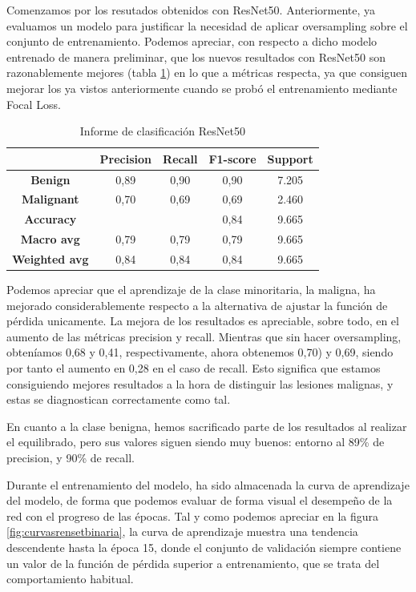 Comenzamos por los resutados obtenidos con ResNet50. Anteriormente, ya evaluamos un modelo para justificar la necesidad de aplicar oversampling sobre el conjunto de entrenamiento. Podemos apreciar, con respecto a dicho modelo entrenado de manera preliminar, que los nuevos resultados con ResNet50 son razonablemente mejores (tabla \ref{tab:resultsbinrn50}) en lo que a métricas respecta, ya que consiguen mejorar los ya vistos anteriormente cuando se probó el entrenamiento mediante Focal Loss.

\begin{table}[!ht]
	\centering
	\begin{tabular}{|c|c|c|c|c|}
		\hline
		\textbf{} & \textbf{Precision} & \textbf{Recall} & \textbf{F1-score} & \textbf{Support} \\ \hline
		\textbf{Benign} & 0,89 & 0,90 & 0,90 & 7.205 \\ \hline
		\textbf{Malignant} & 0,70 & 0,69 & 0,69 & 2.460 \\ \hline
		\textbf{Accuracy} & ~ & ~ & 0,84 & 9.665 \\ \hline
		\textbf{Macro avg} & 0,79 & 0,79 & 0,79 & 9.665 \\ \hline
		\textbf{Weighted avg} & 0,84 & 0,84 & 0,84 & 9.665 \\ \hline
	\end{tabular}
	\caption{Informe de clasificación ResNet50}
	\label{tab:resultsbinrn50}
\end{table}


Podemos apreciar que el aprendizaje de la clase minoritaria, la maligna, ha mejorado considerablemente respecto a la alternativa de ajustar la función de pérdida unicamente. La mejora de los resultados es apreciable, sobre todo, en el aumento de las métricas precision y recall. Mientras que sin hacer oversampling, obteníamos 0,68 y 0,41, respectivamente, ahora obtenemos 0,70) y 0,69, siendo por tanto el aumento en 0,28 en el caso de recall. Esto significa que estamos consiguiendo mejores resultados a la hora de distinguir las lesiones malignas, y estas se diagnostican correctamente como tal.

En cuanto a la clase benigna, hemos sacrificado parte de los resultados al realizar el equilibrado, pero sus valores siguen siendo muy buenos: entorno al 89\% de precision, y 90\% de recall.

Durante el entrenamiento del modelo, ha sido almacenada la curva de aprendizaje del modelo, de forma que podemos evaluar de forma visual el desempeño de la red con el progreso de las  épocas.  Tal y como podemos apreciar en la figura \ref{fig:curvasrensetbinaria}, la curva de aprendizaje muestra una tendencia descendente hasta la época 15, donde el conjunto de validación siempre contiene un valor de la función de pérdida superior a entrenamiento, que se trata del comportamiento habitual.

